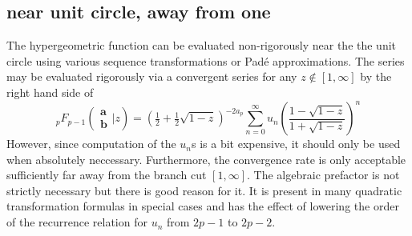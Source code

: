 \documentclass[12pt]{article}
\numberwithin{equation}{section}
\newcommand{\FF}[6] {{}_{#1}{#2}_{#3} \left( \begin{array}{c} #4 \\ #5 \end{array} \Big| {#6}  \right)}
\begin{document}
\subsection{near unit circle, away from one}
The hypergeometric function can be evaluated non-rigorously near the the unit circle using various sequence transformations or Pad\'e approximations. The series may be evaluated rigorously via a convergent series for any $z \not \in [1,\infty]$ by the right hand side of
\begin{equation}
\label{balanced_anywhere}
\FF{p}{F}{p-1}{\mathbf{a}}{\mathbf{b}}{z} = (\tfrac12+ \tfrac12 \sqrt{1-z})^{-2 a_p} \sum_{n=0}^{\infty}u_n \left(\frac{1-\sqrt{1-z}}{1+\sqrt{1-z}}\right)^n
\end{equation}
However, since computation of the $u_n$s is a bit expensive, it should only be used when absolutely neccessary. Furthermore, the convergence rate is only acceptable sufficiently far away from the branch cut $[1,\infty]$. The algebraic prefactor is not strictly necessary but there is good reason for it. It is present in many quadratic transformation formulas in special cases and has the effect of lowering the order of the recurrence relation for $u_n$ from $2p-1$ to $2p-2$.
\end{document}
